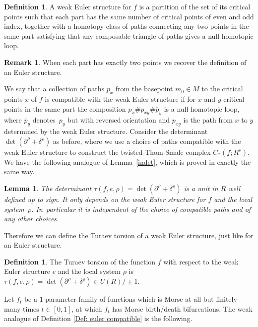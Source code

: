 \documentclass[11pt]{article}
\numberwithin{equation}{section}\providecommand{\dpl}{\displaystyle}
\theoremstyle{plain}
\newtheorem{lemma}[theorem]{Lemma}
\theoremstyle{definition}
\newtheorem{definition}[theorem]{Definition}
\newtheorem{remark}[theorem]{Remark}
\begin{document}
\begin{definition}\label{Definition: weak} A weak Euler structure for $f$ is a partition of the set of its critical points such that each part has the same number of critical points of even and odd index, together with a homotopy class of paths connecting any two points in the same part satisfying that any composable triangle of paths gives a null homotopic loop.
\end{definition}

\begin{remark} When each part has exactly two points we recover the definition of an Euler structure.
\end{remark}

We say that a collection of paths $p_x$ from the basepoint $m_0\in M$ to the critical points $x$ of $f$ is compatible with the weak Euler structure if for $x$ and $y$ critical points in the same part the composition $p_x \# p_{xy} \# \overline{p}_y $ is a null homotopic loop, where $\overline{p}_y$ denotes~$p_y$ but with reversed orientation and $p_{xy}$ is the path from $x$ to $y$ determined by the weak Euler structure. Consider the determinant $\det(\partial^\rho + \delta^\rho)$ as before, where we use a choice of paths compatible with the weak Euler structure to construct the twisted Thom-Smale complex $C_*(f; R^\rho)$. We have the following analogue of Lemma~\ref{indet}, which is proved in exactly the same way.

\begin{lemma}\label{weakindet}
The determinant $\tau(f,e,\rho)=\det(\partial^\rho + \delta^\rho)$ is a unit in $R$ well defined up to sign. It only depends on the weak Euler structure for $f$ and the local system~$\rho$. In~particular it is independent of the choice of compatible paths and of any other choices.
\end{lemma}

Therefore we can define the Turaev torsion of a weak Euler structure, just like for an Euler structure.

\begin{definition}
The Turaev torsion of the function $f$ with respect to the weak Euler structure $e$ and the local system $\rho$ is $\tau(f, e, \rho)=\det(\partial^\rho + \delta^\rho) \in U(R) / \pm 1$.
\end{definition}

Let $f_t$ be a $1$-parameter family of functions which is Morse at all but finitely many times $t \in [0,1]$, at which $f_t$ has Morse birth/death bifurcations. The weak analogue of Definition \ref{Def: euler compatible} is the following.
\end{document}
